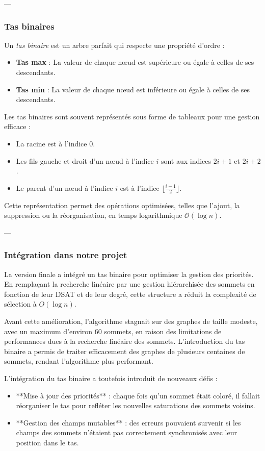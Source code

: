 \documentclass[11pt]{article}
\begin{document}
---

\subsubsection{Tas binaires}
Un \textit{tas binaire} est un arbre parfait qui respecte une propriété d’ordre : \cite {data_structure_complements}
\begin{itemize}
    \item \textbf{Tas max} : La valeur de chaque nœud est supérieure ou égale à celles de ses descendants.
    \item \textbf{Tas min} : La valeur de chaque nœud est inférieure ou égale à celles de ses descendants.
\end{itemize}

Les tas binaires sont souvent représentés sous forme de tableaux pour une gestion efficace :
\begin{itemize}
    \item La racine est à l'indice $0$.
    \item Les fils gauche et droit d’un nœud à l’indice $i$ sont aux indices $2i+1$ et $2i+2$.
    \item Le parent d’un nœud à l’indice $i$ est à l’indice $\lfloor \frac{i-1}{2} \rfloor$.
\end{itemize}

Cette représentation permet des opérations optimisées, telles que l'ajout, la suppression ou la réorganisation, en temps logarithmique $\mathcal{O}(\log n)$.

---

\subsubsection{Intégration dans notre projet}


La version finale a intégré un tas binaire pour optimiser la gestion des priorités. En remplaçant la recherche linéaire par une gestion hiérarchisée des sommets en fonction de leur DSAT et de leur degré, cette structure a réduit la complexité de sélection à \( O(\log n) \).

Avant cette amélioration, l’algorithme stagnait sur des graphes de taille modeste, avec un maximum d’environ 60 sommets, en raison des limitations de performances dues à la recherche linéaire des sommets. L’introduction du tas binaire a permis de traiter efficacement des graphes de plusieurs centaines de sommets, rendant l’algorithme plus performant.


L'intégration du tas binaire a toutefois introduit de nouveaux défis :
\begin{itemize}
    \item **Mise à jour des priorités** : chaque fois qu’un sommet était coloré, il fallait réorganiser le tas pour refléter les nouvelles saturations des sommets voisins.
    \item **Gestion des champs mutables** : des erreurs pouvaient survenir si les champs des sommets n’étaient pas correctement synchronisés avec leur position dans le tas.
\end{itemize}
\end{document}
